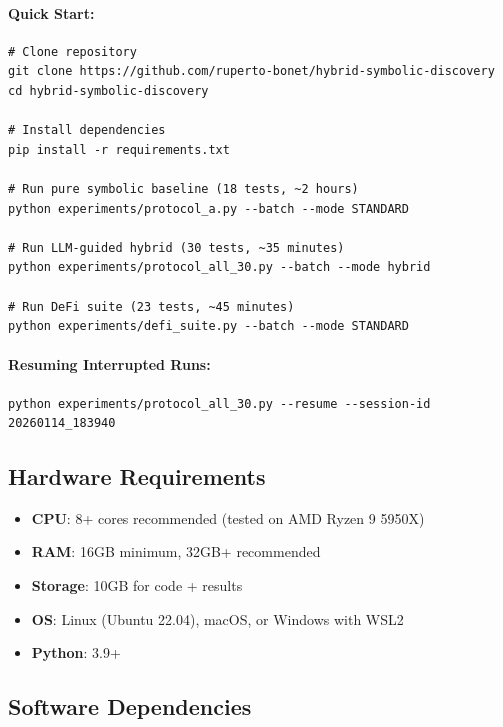 \paragraph{Quick Start:}
\begin{small}
\begin{verbatim}
# Clone repository
git clone https://github.com/ruperto-bonet/hybrid-symbolic-discovery
cd hybrid-symbolic-discovery

# Install dependencies
pip install -r requirements.txt

# Run pure symbolic baseline (18 tests, ~2 hours)
python experiments/protocol_a.py --batch --mode STANDARD

# Run LLM-guided hybrid (30 tests, ~35 minutes)
python experiments/protocol_all_30.py --batch --mode hybrid

# Run DeFi suite (23 tests, ~45 minutes)
python experiments/defi_suite.py --batch --mode STANDARD
\end{verbatim}
\end{small}

\paragraph{Resuming Interrupted Runs:}
\begin{small}
\begin{verbatim}
python experiments/protocol_all_30.py --resume --session-id 20260114_183940
\end{verbatim}
\end{small}

\subsection{Hardware Requirements}

\begin{itemize}
\item \textbf{CPU}: 8+ cores recommended (tested on AMD Ryzen 9 5950X)
\item \textbf{RAM}: 16GB minimum, 32GB+ recommended
\item \textbf{Storage}: 10GB for code + results
\item \textbf{OS}: Linux (Ubuntu 22.04), macOS, or Windows with WSL2
\item \textbf{Python}: 3.9+
\end{itemize}

\subsection{Software Dependencies}

